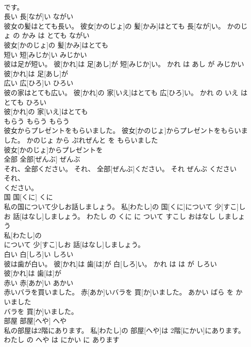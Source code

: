 \documentclass[8pt]{extreport}
\begin{document}
\begin{CJK}{UTF8}{min}
\\	です。			
\\	長い	長[なが]い	ながい	
\\	彼女の髪はとても長い。	彼女[かのじょ]の 髪[かみ]はとても 長[なが]い。	かのじょ の かみ は とても ながい	
\\	彼女[かのじょ]の 髪[かみ]はとても
\\	短い	短[みじか]い	みじかい	
\\	彼は足が短い。	彼[かれ]は 足[あし]が 短[みじか]い。	かれ は あし が みじかい	
\\	彼[かれ]は 足[あし]が
\\	広い	広[ひろ]い	ひろい	
\\	彼の家はとても広い。	彼[かれ]の 家[いえ]はとても 広[ひろ]い。	かれ の いえ は とても ひろい	
\\	彼[かれ]の 家[いえ]はとても
\\	もらう	もらう	もらう	
\\	彼女からプレゼントをもらいました。	彼女[かのじょ]からプレゼントをもらいました。	かのじょ から ぷれぜんと を もらいました	
\\	彼女[かのじょ]からプレゼントを
\\	全部	全部[ぜんぶ]	ぜんぶ	
\\	それ、全部ください。	それ、 全部[ぜんぶ]ください。	それ ぜんぶ ください	
\\	それ、
\\	ください。			
\\	国	国[くに]	くに	
\\	私の国について少しお話しましょう。	私[わたし]の 国[くに]について 少[すこ]しお 話[はなし]しましょう。	わたし の くに に ついて すこし おはなし しましょう	
\\	私[わたし]の
\\	について 少[すこ]しお 話[はなし]しましょう。			
\\	白い	白[しろ]い	しろい	
\\	彼は歯が白い。	彼[かれ]は 歯[は]が 白[しろ]い。	かれ は は が しろい	
\\	彼[かれ]は 歯[は]が
\\	赤い	赤[あか]い	あかい	
\\	赤いバラを買いました。	赤[あか]いバラを 買[か]いました。	あかい ばら を かいました	
\\	バラを 買[か]いました。			
\\	部屋	部屋[へや]	へや	
\\	私の部屋は2階にあります。	私[わたし]の 部屋[へや]は 2階[にかい]にあります。	わたし の へや は にかい に あります	

\end{CJK}
\end{document}
